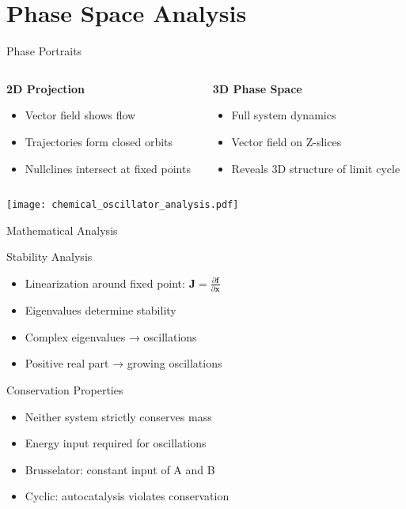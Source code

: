 \documentclass{beamer}
\begin{document}
\section{Phase Space Analysis}

\begin{frame}{Phase Portraits}
\begin{columns}
\begin{column}{0.5\textwidth}
\textbf{2D Projection}
\begin{itemize}
    \item Vector field shows flow
    \item Trajectories form closed orbits
    \item Nullclines intersect at fixed points
\end{itemize}
\end{column}
\begin{column}{0.5\textwidth}
\textbf{3D Phase Space}
\begin{itemize}
    \item Full system dynamics
    \item Vector field on Z-slices
    \item Reveals 3D structure of limit cycle
\end{itemize}
\end{column}
\end{columns}

\vspace{0.5cm}
\begin{center}
\texttt{[image: chemical\_oscillator\_analysis.pdf]}
\end{center}
\end{frame}

\begin{frame}{Mathematical Analysis}
\begin{block}{Stability Analysis}
\begin{itemize}
    \item Linearization around fixed point: $\mathbf{J} = \frac{\partial \mathbf{f}}{\partial \mathbf{x}}$
    \item Eigenvalues determine stability
    \item Complex eigenvalues → oscillations
    \item Positive real part → growing oscillations
\end{itemize}
\end{block}

\begin{block}{Conservation Properties}
\begin{itemize}
    \item Neither system strictly conserves mass
    \item Energy input required for oscillations
    \item Brusselator: constant input of A and B
    \item Cyclic: autocatalysis violates conservation
\end{itemize}
\end{block}
\end{frame}
\end{document}
